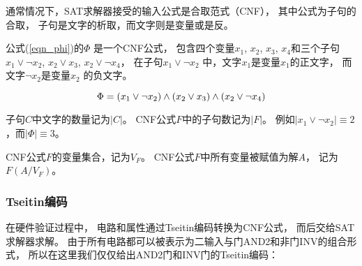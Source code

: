 通常情况下，SAT求解器接受的输入公式是合取范式（CNF），
其中公式为子句的合取，
子句是文字的析取，而文字则是变量或是反。

公式(\ref{eqn_phi})的$\Phi$ 是一个CNF公式，
包含四个变量$x_1$, $x_2$, $x_3$, $x_4$和三个子句 $x_1\vee \neg x_2$, $x_2\vee x_3$, $x_2\vee \neg x_4$，
在子句$x_1\vee \neg x_2$ 中，文字$x_1$是变量$x_1$的正文字，
而文字$\neg x_2$是变量$x_2$ 的负文字。

\begin{equation}\label{eqn_phi}
\centering \Phi=(x_1\vee \neg x_2)
\wedge(x_2\vee x_3)
\wedge(x_2\vee \neg x_4)
\end{equation}

子句$C$中文字的数量记为$|C|$。
CNF公式$F$中的子句数记为$|F|$。
例如$| x_1\vee  \neg x_2 |\equiv 2$，而$|\Phi|\equiv 3$。

CNF公式$F$的变量集合，记为$V_{F}$。
CNF公式$F$中所有变量被赋值为解$A$，
记为$F(A/V_{F})$。


\subsubsection{Tseitin编码}\label{subsubsec_tseitin}
在硬件验证过程中，
电路和属性通过Tseitin编码转换为CNF公式，
而后交给SAT求解器求解。
由于所有电路都可以被表示为二输入与门AND2和非门INV的组合形式，
所以在这里我们仅仅给出AND2门和INV门的Tseitin编码：

